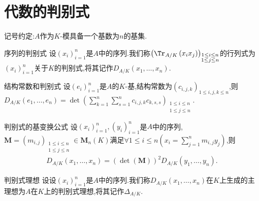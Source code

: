 \section{代数的判别式}

记号约定:$A$作为$K$-模具备一个基数为$n$的基集.

\begin{definition}{序列的判别式}{}
	设$\left(x_{i}\right)_{i=1}^{n}$是$A$中的序列.我们称$\left(\Tr_{A/K}\left(x_{i}x_{j}\right)\right)_{\substack{1\leq i\leq n\\1\leq j\leq n}}$的行列式为$\left(x_{i}\right)_{i=1}^{n}$关于$K$的判别式,将其记作$D_{A/K}\left(x_{1},\ldots,x_{n}\right)$.
\end{definition}

\begin{proposition}{结构常数和判别式}{}
	设$\left(e_{i}\right)_{i=1}^{n}$是$A$的$K$-基,结构常数为$\left(c_{i,j,k}\right)_{1\leq i,j,k\leq n}$,则$D_{A/K}\left(e_{1},\ldots,e_{n}\right)=\det\left(\sum\limits_{k=1}^{n}\sum\limits_{s=1}^{n}c_{i,j,k}c_{k,s,s}\right)_{\substack{1\leq i\leq n\\1\leq j\leq n}}$.
\end{proposition}

\begin{proposition}{判别式的基变换公式}{}
	设$\left(x_{i}\right)_{i=1}^{n},\left(y_{i}\right)_{i=1}^{n}$是$A$中的序列,$\boldsymbol{M}=\left(m_{i,j}\right)_{\substack{1\leq i\leq n\\1\leq j\leq n}}\in\mathbf{M}_{n}\left(K\right)$满足$\forall 1\leq i\leq n\left(x_{i}=\sum\limits_{j=1}^{n}m_{i,j}y_{j}\right)$,则
	\begin{align*}
		D_{A/K}\left(x_{1},\ldots,x_{n}\right)=\left(\det\left(\boldsymbol{M}\right)\right)^{2}D_{A/K}\left(y_{1},\ldots,y_{n}\right).
	\end{align*}
\end{proposition}

\begin{definition}{判别式理想}{}
	设设$\left(x_{i}\right)_{i=1}^{n}$是$A$中的序列.我们称$D_{A/K}\left(x_{1},\ldots,x_{n}\right)$在$K$上生成的主理想为$A$在$K$上的判别式理想,将其记作$\Delta_{A/K}$.
\end{definition}


